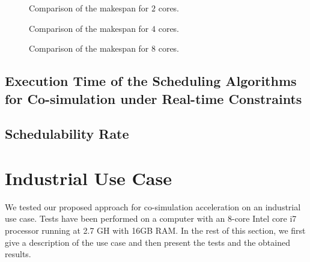 \begin{figure}[phbt]
\centering

\caption{Comparison of the makespan for $2$ cores.}
\label{fig:sched_mkspan_2}
\end{figure}

\begin{figure}[phbt]
\centering

\caption{Comparison of the makespan for $4$ cores.}
\label{fig:sched_mkspan_4}
\end{figure}

\begin{figure}[phbt]
\centering

\caption{Comparison of the makespan for $8$ cores.}
\label{fig:sched_mkspan_8}
\end{figure} 

%

\subsection{Execution Time of the Scheduling Algorithms for Co-simulation under Real-time Constraints}

\subsection{Schedulability Rate}

\section{Industrial Use Case} 

We tested our proposed approach for co-simulation acceleration on an industrial use case. Tests have been performed on a computer with an 8-core Intel core i7 processor running at 2.7 GH with 16GB RAM. In the rest of this section, we first give a description of the use case and then present the tests and the obtained results.

